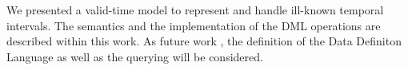 We presented a valid-time model to represent and handle ill-known temporal intervals. The semantics and the implementation of the DML operations are described within this work. As future work , the definition of the Data Definiton Language as well as the querying will be considered.
